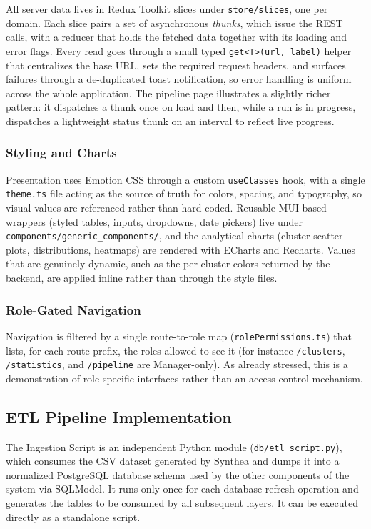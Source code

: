 All server data lives in Redux Toolkit slices under \texttt{store/slices}, one per domain. Each slice pairs a set of asynchronous \emph{thunks}, which issue the REST calls, with a reducer that holds the fetched data together with its loading and error flags. Every read goes through a small typed \texttt{get<T>(url, label)} helper that centralizes the base URL, sets the required request headers, and surfaces failures through a de-duplicated toast notification, so error handling is uniform across the whole application. The pipeline page illustrates a slightly richer pattern: it dispatches a thunk once on load and then, while a run is in progress, dispatches a lightweight status thunk on an interval to reflect live progress.

\subsubsection*{Styling and Charts}

Presentation uses Emotion CSS through a custom \texttt{useClasses} hook, with a single \texttt{theme.ts} file acting as the source of truth for colors, spacing, and typography, so visual values are referenced rather than hard-coded. Reusable MUI-based wrappers (styled tables, inputs, dropdowns, date pickers) live under \texttt{components/generic\_components/}, and the analytical charts (cluster scatter plots, distributions, heatmaps) are rendered with ECharts and Recharts. Values that are genuinely dynamic, such as the per-cluster colors returned by the backend, are applied inline rather than through the style files.

\subsubsection*{Role-Gated Navigation}

Navigation is filtered by a single route-to-role map (\texttt{rolePermissions.ts}) that lists, for each route prefix, the roles allowed to see it (for instance \texttt{/clusters}, \texttt{/statistics}, and \texttt{/pipeline} are Manager-only). As already stressed, this is a demonstration of role-specific interfaces rather than an access-control mechanism.

\subsection{ETL Pipeline Implementation}

The Ingestion Script is an independent Python module (\texttt{db/etl\_script.py}), which consumes the CSV dataset generated by Synthea and dumps it into a normalized PostgreSQL database schema used by the other components of the system via SQLModel. It runs only once for each database refresh operation and generates the tables to be consumed by all subsequent layers. It can be executed directly as a standalone script.

